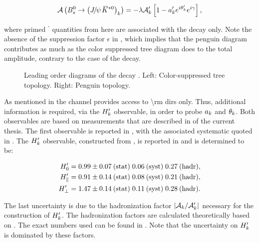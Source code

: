 \begin{equation}
  \mathcal{A} \parenthesis{\BsJpsiKstPolState{k}} = -\lambda \formFctr{k}' \brackets{ 1 - \akPeng' e^{i\thkPeng'} e^{i\gamma} },
  \label{bsjpsikst_amp}
\end{equation}

\noindent where primed ${}^\prime$ quantities from here are associated with the \BsJpsiKst decay only.
Note the absence of the suppression factor $\epsilon$ in , which implies that the penguin diagram
contributes as much as the color suppressed tree diagram does to the total amplitude, contrary to the case of the \BsJpsiPhi decay.

\begin{figure}[t]
  \centering
  \scalebox{0.9}{\sffamily }
  \caption{Leading order diagrams of the decay \BsJpsiKst. Left: Color-suppressed tree topology. Right: Penguin topology.}
  \label{bs2jpsikst}
\end{figure}

As mentioned in  the \BsJpsiKst channel provides access to \Acp{\rm dir} only.
Thus, additional information is required, via the $H_{k}'$ observable, in order to probe $a_k$ and $\theta_k$.
Both observables are based on measurements that are described in  of the current thesis.
The first observable is reported in , with the associated systematic quoted in .
The $H_{k}'$ observable, constructed from \BRof{\BsJpsiKst}, is reported in 
and is determined to be:

\begin{subequations}
  \label{hobs_jpsikst}
  \begin{align}
  H_{0}'         & = 0.99 \pm 0.07\:\text{(stat)} \; 0.06\:\text{(syst)} \; 0.27\:(\text{hadr}) , \label{hobs_jpsikst_long} \\
  H_{\parallel}' & = 0.91 \pm 0.14\:\text{(stat)} \; 0.08\:\text{(syst)} \; 0.21\:(\text{hadr}) , \label{hobs_jpsikst_para} \\
  H_{\perp}'     & = 1.47 \pm 0.14\:\text{(stat)} \; 0.11\:\text{(syst)} \; 0.28\:(\text{hadr}) . \label{hobs_jpsikst_perp}
  \end{align}
\end{subequations}

\noindent The last uncertainty is due to the hadronization factor $|\mathcal{A}_{k}/\mathcal{A}_{k}'|$ necessary for the construction of $H_{k}'$.
The hadronization factors are calculated theoretically based on \cite{eff-hamiltonian-bs-syst}.
The exact numbers used can be found in \cite{DeBruyn-thesis}. Note that the uncertainty on $H_{k}'$ is dominated by these factors.

